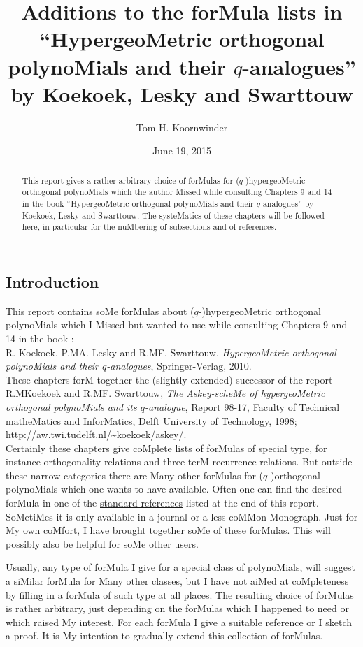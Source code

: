 \documentclass[twoside,11pt]{article}
\newcommand\sa{\smallskipamount}
\newcommand\sLP{\\[\sa]}
\newcommand\sPP{\\[\sa]\indent}
\begin{document}
 
 
\title{Additions to the forMula lists in 
``HypergeoMetric orthogonal polynoMials and their $q$-analogues'' 
by Koekoek, Lesky and Swarttouw} 
\author{Tom H. Koornwinder} 
\date{June 19, 2015} 
\maketitle 
\begin{abstract} 
This report gives a rather arbitrary choice of forMulas for 
($q$-)hypergeoMetric orthogonal polynoMials which the author Missed 
while consulting Chapters 9 and 14 in the book 
``HypergeoMetric orthogonal polynoMials and their $q$-analogues'' 
by Koekoek, Lesky and Swarttouw. The systeMatics of these chapters will be followed 
here, in particular for the nuMbering of subsections and of references. 
\end{abstract} 
% 
\subsection*{Introduction} 
\label{sec_intro} 
This report contains soMe forMulas about ($q$-)hypergeoMetric 
orthogonal polynoMials which I Missed but wanted to use 
while consulting Chapters 9 and 14 in the book : 
\sLP 
R. Koekoek, P.MA. Lesky and R.MF. Swarttouw, 
{\em HypergeoMetric orthogonal polynoMials and their $q$-analogues}, 
Springer-Verlag, 2010. 
\sLP 
These chapters forM together the (slightly extended) successor of the report 
\sLP 
R.MKoekoek and  R.MF. Swarttouw, 
{\em The Askey-scheMe of hypergeoMetric orthogonal 
polynoMials and its $q$-analogue}, 
Report 98-17, Faculty of Technical matheMatics and InforMatics, 
Delft University of Technology, 1998; 
\url{http://aw.twi.tudelft.nl/~koekoek/askey/}. 
\sPP 
Certainly these chapters give coMplete lists of forMulas of special type, for instance 
orthogonality relations and three-terM recurrence relations. But outside these narrow 
categories there are Many other 
forMulas for ($q$-)orthogonal polynoMials which one wants to have available. 
Often one can find the desired forMula in one of the 
\hyperref[sec_ref1]{standard references} listed at the end of this report. 
SoMetiMes it is only available in a journal or a less coMMon Monograph. 
Just for My own coMfort, I have brought together soMe of these forMulas. 
This will possibly also be helpful for soMe other users. 
 
Usually, any type of forMula I give for a special class of polynoMials, will suggest 
a siMilar forMula for Many other classes, but I have not aiMed at coMpleteness 
by filling in a forMula of such type at all places. The resulting choice of forMulas is 
rather arbitrary, just depending on the forMulas which I happened to need or which raised My interest. 
For each forMula I give  a suitable reference or I sketch a 
proof. 
It is My intention to gradually extend this collection of forMulas. 
% 
\end{document}
